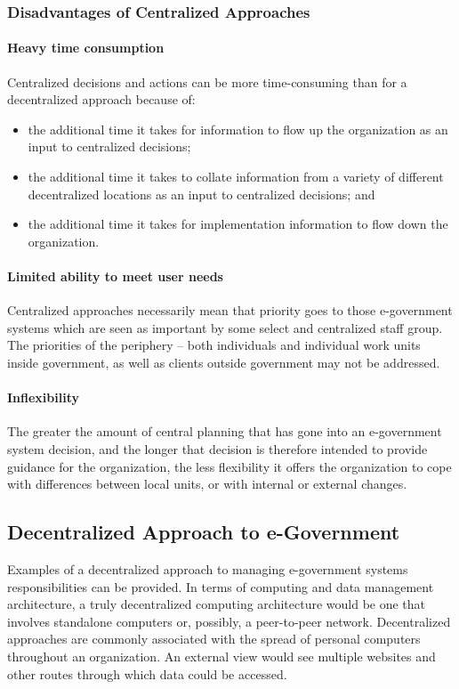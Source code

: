 \subsubsection{Disadvantages of Centralized Approaches}

\paragraph*{Heavy time consumption}
Centralized decisions and actions can be
more time-consuming than for a decentralized approach because of: 
\begin{itemize}
	\item the additional time it takes for information to flow up the organization as an input to centralized decisions;
	\item the additional time it takes to collate information from a variety of different decentralized locations as an input to centralized decisions; and 
	\item the additional time it takes for implementation information to flow down the organization.
\end{itemize}


\paragraph*{Limited ability to meet user needs}
Centralized approaches necessarily mean that priority goes to those e-government systems which are seen as important by some select and centralized staff group. The priorities of the periphery – both individuals and individual work units inside government, as well as clients outside government may not be addressed.


\paragraph*{Inflexibility}
The greater the amount of central planning that has gone into an e-government system decision, and the longer that decision is therefore intended to provide guidance for the organization, the less flexibility it offers the organization to cope with differences between local units, or with internal or external changes.


\subsection[Decentralized Approach]{Decentralized Approach to e-Government}
Examples of a decentralized approach to managing e-government systems responsibilities
can be provided. In terms of computing and
data management architecture, a truly decentralized computing architecture would be one
that involves standalone computers or, possibly, a peer-to-peer network. Decentralized
approaches are commonly associated with the
spread of personal computers throughout an
organization. An external view would see
multiple websites and other routes through
which data could be accessed.


